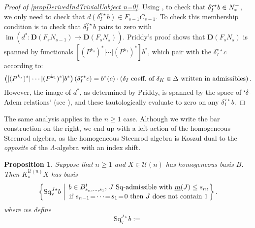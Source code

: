 \documentclass[11pt]{amsart} \renewcommand{\baselinestretch}{1.4}
\theoremstyle{plain}
\newtheorem{prop}[thm]{Proposition}
\theoremstyle{definition}
\DeclareMathOperator{\im}{im}
\renewcommand{\to}{\longrightarrow}
\newcommand{\calU}{\mathcal{U}}
\newcommand{\deltaalg}{\Delta} %
\newcommand{\minDimSq}{\underline{m}}
\newcommand{\produces}[3]{#3:#1\sim #2}
\renewcommand{\produces}[3]{#1\rightarrow_{#3} #2}%
\renewcommand{\produces}[3]{#1\overset{\smash{#3}}{\rightarrow} #2}%
\newcommand{\Nop}{N^{\smash{-}}}
\newcommand{\Sq}{\mathrm{Sq}}
\newcommand{\dver}{_\mathrm{v}}
\newcommand{\Sqvstar}[1]{\mathrm{Sq}\dver^{#1\star}}
\newcommand{\deltavstar}{\delta^{\mathrm{v}\star}}
\newcommand{\dual}{\mathbf{D}}
\begin{document}
\begin{Koszul complexes}
\begin{proof}[Proof of \ref{propDerivedIndTrivialUobject n=0}]
Using \cite[Lemma 3.2]{PriddyKoszul.pdf}, to check that $\deltavstar_Ib\in\Nop_*$, we only need to check that $d(\deltavstar_Ib)\in F_{s-1}C_{s-1}$.
To check this membership condition is to check that $\deltavstar_Ib$ pairs to zero with $\im(d^*:\dual(F_sN_{s-1})\to\dual(F_sN_s))$. Priddy's proof shows that $\dual(F_sN_s)$ is spanned by functionals $[(P^{k_s})^*|\cdots |(P^{k_1})^*]b^*$, which pair with the $\deltavstar_Ic$ according to: %
\[\left([(P^{k_s})^*|\cdots |(P^{k_1})^*]b^*\right)\left(\deltavstar_Ic\right)= b^*(c)\cdot\left(\textup{$\delta_I$ coeff.\ of $\delta_K\in\deltaalg$ written in admissibles}\right).\]
However, the image of $d^*$, as determined by Priddy, is spanned by the space of `$\delta$-Adem relations' (see \cite[Theorem 2.5 and proof]{PriddyKoszul.pdf}), and these tautologically evaluate to zero on any $\deltavstar_Ib$.
\end{proof}
The same analysis applies in the $n\geq1$ case. Although we write the bar construction on the right, we end up with a left action of the homogeneous Steenrod algebra, as the homogeneous Steenrod algebra is Koszul dual to the \emph{opposite} of the $\Lambda$-algebra with an index shift.
\begin{prop}
\label{propDerivedIndTrivialUobject n at least 1}
Suppose that $n\geq1$ and $X\in\calU(n)$ has homogeneous basis $B$. Then $K_*^{\calU(n)}X$ has basis
\[\left\{\Sqvstar{J}b\ \middle|\ \genfrac{}{}{0pt}{}{b\in B_{s_{n},\ldots,s_1}^t\textup{, $J$ $\Sq$-admissible with }\minDimSq(J)\leq s_n,}{\textup{if }s_{n-1}\!=\!\cdots\!=\!s_1\!=\!0\textup{ then $J$ does not contain 1}}\right\}.\]
where we define
\[\Sqvstar{J}b:=
\]
\end{prop}
\end{Koszul complexes}
\end{document}

